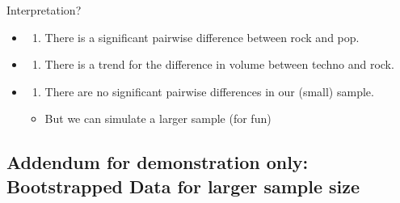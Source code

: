 \documentclass[
]{book}
\newenvironment{Shaded}{\begin{snugshade}}{\end{snugshade}}
\newcommand{\CommentTok}[1]{\textcolor[rgb]{0.56,0.35,0.01}{\textit{#1}}}
\newcommand{\FunctionTok}[1]{\textcolor[rgb]{0.13,0.29,0.53}{\textbf{#1}}}
\newcommand{\NormalTok}[1]{#1}
\providecommand{\tightlist}{%
  \setlength{\itemsep}{0pt}\setlength{\parskip}{0pt}}
\begin{document}
\begin{Shaded}
\end{Shaded}

Interpretation?

\begin{itemize}
\item
  \begin{enumerate}
  \def\labelenumi{(\Alph{enumi})}
  \tightlist
  \item
    There is a significant pairwise difference between rock and pop.\\
  \end{enumerate}
\item
  \begin{enumerate}
  \def\labelenumi{(\Alph{enumi})}
  \setcounter{enumi}{1}
  \tightlist
  \item
    There is a trend for the difference in volume between techno and rock.\\
  \end{enumerate}
\item
  \begin{enumerate}
  \def\labelenumi{(\Alph{enumi})}
  \setcounter{enumi}{2}
  \tightlist
  \item
    There are no significant pairwise differences in our (small) sample.
  \end{enumerate}

  \begin{itemize}
  \tightlist
  \item
    But we can simulate a larger sample (for fun)
  \end{itemize}
\end{itemize}

\subsection{Addendum for demonstration only: Bootstrapped Data for larger sample size}\label{addendum-for-demonstration-only-bootstrapped-data-for-larger-sample-size}
\end{document}
